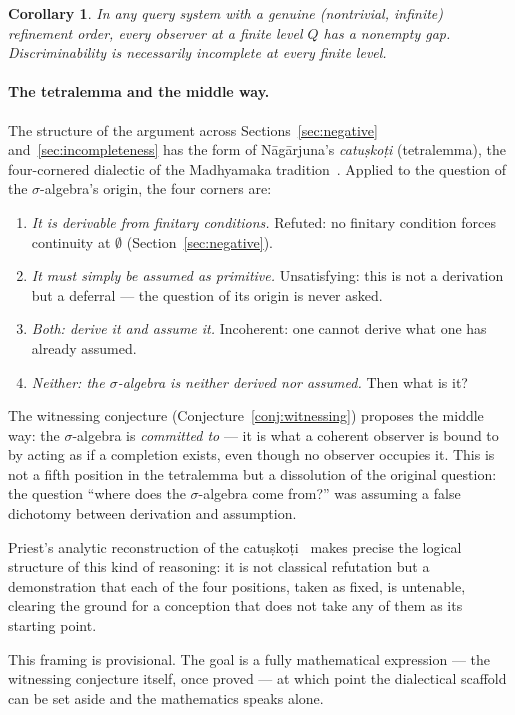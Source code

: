 \documentclass[12pt]{article}
\newtheorem{corollary}[theorem]{Corollary}
\theoremstyle{definition}
\theoremstyle{remark}
\begin{document}
\begin{corollary}
In any query system with a genuine (nontrivial, infinite) refinement order, every
observer at a finite level $Q$ has a nonempty gap.  Discriminability is necessarily
incomplete at every finite level.
\end{corollary}

\begin{aside}
\paragraph{The tetralemma and the middle way.}
The structure of the argument across Sections~\ref{sec:negative}
and~\ref{sec:incompleteness} has the form of N\=ag\=arjuna's
\emph{catu\d{s}ko\d{t}i} (tetralemma), the four-cornered dialectic of the
Madhyamaka tradition~\cite{Nagarjuna1995,Garfield1995}.  Applied to the question
of the $\sigma$-algebra's origin, the four corners are:

\begin{enumerate}
  \item \emph{It is derivable from finitary conditions.}
    Refuted: no finitary condition forces continuity at $\emptyset$
    (Section~\ref{sec:negative}).

  \item \emph{It must simply be assumed as primitive.}
    Unsatisfying: this is not a derivation but a deferral --- the question of
    its origin is never asked.

  \item \emph{Both: derive it and assume it.}
    Incoherent: one cannot derive what one has already assumed.

  \item \emph{Neither: the $\sigma$-algebra is neither derived nor assumed.}
    Then what is it?
\end{enumerate}

The witnessing conjecture (Conjecture~\ref{conj:witnessing}) proposes the middle
way: the $\sigma$-algebra is \emph{committed to} --- it is what a coherent observer
is bound to by acting as if a completion exists, even though no observer occupies
it.  This is not a fifth position in the tetralemma but a dissolution of the
original question: the question ``where does the $\sigma$-algebra come from?'' was
assuming a false dichotomy between derivation and assumption.

Priest's analytic reconstruction of the catuṣkoṭi~\cite{PriestBeyond2010} makes
precise the logical structure of this kind of reasoning: it is not classical
refutation but a demonstration that each of the four positions, taken as fixed, is
untenable, clearing the ground for a conception that does not take any of them as
its starting point.

This framing is provisional.  The goal is a fully mathematical expression ---
the witnessing conjecture itself, once proved --- at which point the dialectical
scaffold can be set aside and the mathematics speaks alone.
\end{aside}
\end{document}
